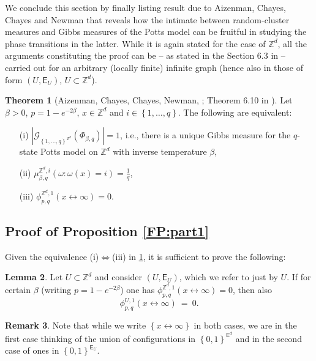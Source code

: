 \documentclass[12pt]{article}
\newcommand{\E}{\mathsf{E}}
\newcommand{\G}{\mathcal{G}}
\newcommand{\Z}{\mathbb{Z}}
\newcommand{\set}[1]{\left\{#1\right\}}
\newcommand{\1}{\mathbbm{1}}
\newcommand{\5}{\vspace{0.5cm}}
\theoremstyle{definition}
\newtheorem{thm}{Theorem}[section]
\newtheorem{rem}[thm]{Remark}
\newtheorem{lem}[thm]{Lemma}
\begin{document}
We conclude this section by finally listing result due to Aizenman, Chayes, Chayes and Newman that reveals how the intimate between random-cluster measures and Gibbs measures of the Potts model can be fruitful in studying the phase transitions in the latter. While it is again stated for the case of $\Z^d$, all the arguments constituting the proof can be -- as stated in the Section 6.3 in \cite{GHM} -- carried out for an arbitrary (locally finite) infinite graph (hence also in those of form $(U,\E_U)$, $U\subset\Z^d$).

\begin{thm}[Aizenman, Chayes, Chayes, Newman, \cite{ACCN}; Theorem 6.10 in \cite{GHM}]\label{ACCN} Let $\beta>0$, $p=1-e^{-2\beta}$, $x\in\Z^d$ and $i\in\set{1,\ldots,q}$. The following are equivalent:
\begin{itemize}
	\item[(i)] $|\G_{\set{1,\ldots,q}^{\Z^d}}(\Phi_{\beta,q})|=1$, i.e., there is a unique Gibbs measure for the $q$-state Potts model on $\Z^d$ with inverse temperature $\beta$,
	\item[(ii)] $\mu_{\beta,q}^{\Z^d,i}(\omega:\omega(x)=i)=\frac{1}{q}$,
	\item[(iii)] $\phi_{p,q}^{\Z^d,1}(x\leftrightarrow\infty)=0$.
\end{itemize}
\end{thm}


\subsection{Proof of Proposition \ref{FP:part1}}

Given the equivalence (i)$\Leftrightarrow$(iii) in \ref{ACCN}, it is sufficient to prove the following:
\begin{lem}\label{part1:MainLemma}
Let $U\subset\Z^d$ and consider $(U,\E_U)$, which we refer to just by $U$. If for certain $\beta$ (writing $p=1-e^{-2\beta}$) one has $\phi_{p,q}^{\Z^d,1}(x\leftrightarrow\infty)=0$, then also
$$\phi_{p,q}^{U,1}(x\leftrightarrow\infty) ~=~ 0.$$
\end{lem}
\begin{rem}
Note that while we write $\set{x\leftrightarrow\infty}$ in both cases, we are in the first case thinking of the union of configurations in $\set{0,1}^{\E^d}$ and in the second case of ones in $\set{0,1}^{\E_U}$.
\end{rem}
\end{document}

